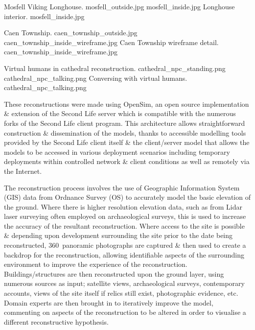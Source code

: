  {Mosfell Viking Longhouse.} {mosfell_outside.jpg}
	   {mosfell_inside.jpg} {Longhouse interior.} {mosfell_inside.jpg}

 {Caen Township.} {caen_township_outside.jpg}
       {caen_township_inside_wireframe.jpg} {Caen Township wireframe detail.} {caen_township_inside_wireframe.jpg}

 {Virtual humans in cathedral reconstruction.} {cathedral_npc_standing.png}
       {cathedral_npc_talking.png} {Conversing with virtual humans.} {cathedral_npc_talking.png}

These reconstructions were made using OpenSim, an open source implementation \& extension of the Second Life server which is compatible with the numerous forks of the Second Life client program. This architecture allows straightforward construction \& dissemination of the models, thanks to accessible modelling tools provided by the Second Life client itself \& the client/server model that allows the models to be accessed in various deployment scenarios including temporary deployments within controlled network \& client conditions as well as remotely via the Internet.

The reconstruction process involves the use of Geographic Information System (GIS) data from Ordnance Survey (OS) to accurately model the basic elevation of the ground. Where there is higher resolution elevation data, such as from Lidar laser surveying often employed on archaeological surveys, this is used to increase the accuracy of the resultant reconstruction. Where access to the site is possible \& depending upon development surrounding the site prior to the date being reconstructed, 360\textdegree\ panoramic photographs are captured \& then used to create a backdrop for the reconstruction, allowing identifiable aspects of the surrounding environment to improve the experience of the reconstruction. Buildings/structures are then reconstructed upon the ground layer, using numerous sources as input; satellite views, archaeological surveys, contemporary accounts, views of the site itself if relics still exist, photographic evidence, etc. Domain experts are then brought in to iteratively improve the model, commenting on aspects of the reconstruction to be altered in order to visualise a different reconstructive hypothesis.

